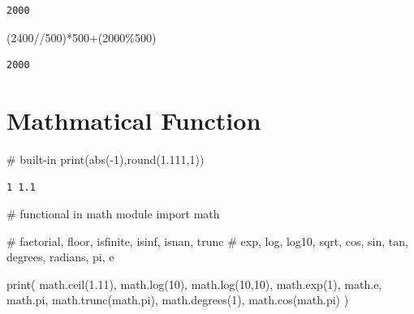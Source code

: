 \documentclass[
  letterpaper,
  DIV=11,
  numbers=noendperiod]{scrreprt}
\newenvironment{Shaded}{\begin{snugshade}}{\end{snugshade}}
\newcommand{\BuiltInTok}[1]{\textcolor[rgb]{0.00,0.23,0.31}{#1}}
\newcommand{\CommentTok}[1]{\textcolor[rgb]{0.37,0.37,0.37}{#1}}
\newcommand{\DecValTok}[1]{\textcolor[rgb]{0.68,0.00,0.00}{#1}}
\newcommand{\FloatTok}[1]{\textcolor[rgb]{0.68,0.00,0.00}{#1}}
\newcommand{\ImportTok}[1]{\textcolor[rgb]{0.00,0.46,0.62}{#1}}
\newcommand{\NormalTok}[1]{\textcolor[rgb]{0.00,0.23,0.31}{#1}}
\newcommand{\OperatorTok}[1]{\textcolor[rgb]{0.37,0.37,0.37}{#1}}
\begin{document}
\begin{verbatim}
2000
\end{verbatim}

\begin{Shaded}
\begin{Highlighting}[]
\NormalTok{(}\DecValTok{2400}\OperatorTok{//}\DecValTok{500}\NormalTok{)}\OperatorTok{*}\DecValTok{500}\OperatorTok{+}\NormalTok{(}\DecValTok{2000}\OperatorTok{\%}\DecValTok{500}\NormalTok{)}
\end{Highlighting}
\end{Shaded}

\begin{verbatim}
2000
\end{verbatim}

\section{Mathmatical Function}\label{mathmatical-function}

\begin{Shaded}
\begin{Highlighting}[]
\CommentTok{\# built{-}in}
\BuiltInTok{print}\NormalTok{(}\BuiltInTok{abs}\NormalTok{(}\OperatorTok{{-}}\DecValTok{1}\NormalTok{),}\BuiltInTok{round}\NormalTok{(}\FloatTok{1.111}\NormalTok{,}\DecValTok{1}\NormalTok{))}
\end{Highlighting}
\end{Shaded}

\begin{verbatim}
1 1.1
\end{verbatim}

\begin{Shaded}
\begin{Highlighting}[]
\CommentTok{\# functional in math module}
\ImportTok{import}\NormalTok{ math}

\CommentTok{\# factorial, floor, isfinite, isinf, isnan, trunc}
\CommentTok{\# exp, log, log10, sqrt, cos, sin, tan, degrees, radians, pi, e}

\BuiltInTok{print}\NormalTok{(}
\NormalTok{math.ceil(}\FloatTok{1.11}\NormalTok{),}
\NormalTok{math.log(}\DecValTok{10}\NormalTok{),}
\NormalTok{math.log(}\DecValTok{10}\NormalTok{,}\DecValTok{10}\NormalTok{),}
\NormalTok{math.exp(}\DecValTok{1}\NormalTok{),}
\NormalTok{math.e,}
\NormalTok{math.pi,}
\NormalTok{math.trunc(math.pi),}
\NormalTok{math.degrees(}\DecValTok{1}\NormalTok{),}
\NormalTok{math.cos(math.pi)}
\NormalTok{)}
\end{Highlighting}
\end{Shaded}
\end{document}
